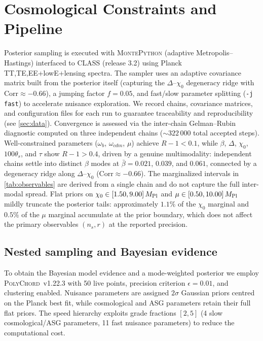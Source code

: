 \documentclass[11pt,a4paper]{article}
\begin{document}
\section{Cosmological Constraints and Pipeline}
\label{sec:constraints}
Posterior sampling is executed with \textsc{MontePython} (adaptive Metropolis--Hastings) interfaced to \textsc{CLASS} (release 3.2) using Planck TT,TE,EE+lowE+lensing spectra. The sampler uses an adaptive covariance matrix built from the posterior itself (capturing the $\Delta$--$\chi_0$ degeneracy ridge with $\mathrm{Corr}\approx-0.66$), a jumping factor $f=0.05$, and fast/slow parameter splitting (\texttt{-j fast}) to accelerate nuisance exploration. We record chains, covariance matrices, and configuration files for each run to guarantee traceability and reproducibility (see \cref{sec:data}). Convergence is assessed via the inter-chain Gelman--Rubin diagnostic computed on three independent chains (${\sim}322\,000$ total accepted steps). Well-constrained parameters ($\omega_b$, $\omega_{cdm}$, $\mu$) achieve $R{-}1<0.1$, while $\beta$, $\Delta$, $\chi_0$, $100\theta_s$, and $\tau$ show $R{-}1>0.4$, driven by a genuine multimodality: independent chains settle into distinct $\beta$ modes at $\bar\beta=0.021$, $0.039$, and $0.061$, connected by a degeneracy ridge along $\Delta$--$\chi_0$ ($\mathrm{Corr}\approx-0.66$). The marginalized intervals in \cref{tab:observables} are derived from a single chain and do not capture the full inter-modal spread. Flat priors on $\chi_0\in[1.50,9.00]\,M_{\rm Pl}$ and $\mu\in[0.50,10.00]\,M_{\rm Pl}$ mildly truncate the posterior tails: approximately $1.1\%$ of the $\chi_0$ marginal and $0.5\%$ of the $\mu$ marginal accumulate at the prior boundary, which does not affect the primary observables $(n_s,r)$ at the reported precision.

\subsection{Nested sampling and Bayesian evidence}
\label{sec:evidence}
To obtain the Bayesian model evidence and a mode-weighted posterior we employ \textsc{PolyChord}~v1.22.3 \cite{Handley2015a,Handley2015b} with 50 live points, precision criterion $\epsilon=0.01$, and clustering enabled. Nuisance parameters are assigned $2\sigma$ Gaussian priors centred on the Planck best fit, while cosmological and ASG parameters retain their full flat priors. The speed hierarchy exploits grade fractions $[2,5]$ (4 slow cosmological/ASG parameters, 11 fast nuisance parameters) to reduce the computational cost.
\end{document}
